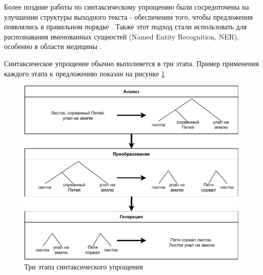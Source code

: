 Более поздние работы по синтаксическому упрощению были сосредоточены на улучшении структуры выходного текста - обеспечении того, чтобы предложения появлялись в правильном порядке \cite{siddharthan_syntactic_2006}. Также этот подход стали использовать для распознавания именованных сущностей (Named Entity Recognition, NER), особенно в области медицины \cite{jonnalagadda_biosimplify_2010}.

Синтаксическое упрощение обычно выполняется в три этапа. Пример применения каждого этапа к предложению показан на рисунке \ref{fig:3steps}

\clearpage
\begin{figure}[h!]
	\begin{center}
		\includegraphics[pages=-, scale=0.9]{./inc/img/3steps_my.pdf}
		\caption{Три этапа синтаксического упрощения}  
		\label{fig:3steps}
	\end{center}
\end{figure}



